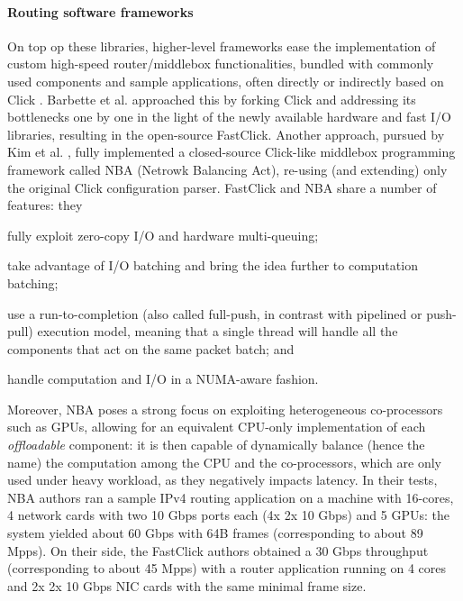 \documentclass[11pt,a4paper,twoside,titlepage,openany]{book}
\begin{document}
\paragraph{Routing software frameworks} On top op these libraries, higher-level frameworks ease the implementation of custom high-speed router/middlebox functionalities, bundled with commonly used components and sample applications, often directly or indirectly based on Click \cite{click}.
Barbette et al. \cite{fastclick} approached this by forking Click and addressing its bottlenecks one by one in the light of the newly available hardware and fast I/O libraries, resulting in the open-source FastClick. Another approach, pursued by Kim et al. \cite{nba}, fully implemented a closed-source Click-like middlebox programming framework called NBA (Netrowk Balancing Act), re-using (and extending) only the original Click configuration parser. %
FastClick and NBA share a number of features: they
\begin{inlineenum}
\item fully exploit zero-copy I/O and hardware multi-queuing;
\item take advantage of I/O batching and bring the idea further to computation batching;
\item use a run-to-completion (also called full-push, in contrast with pipelined or push-pull) execution model, meaning that a single thread will handle all the components that act on the same packet batch; and
\item handle computation and I/O in a \gls{NUMA}-aware fashion.
\end{inlineenum}
Moreover, NBA poses a strong focus on exploiting heterogeneous co-processors such as GPUs, allowing for an equivalent CPU-only implementation of each \emph{offloadable} component: it is then capable of dynamically balance (hence the name) the computation among the CPU and the co-processors, which are only used under heavy workload, as they negatively impacts latency. In their tests, NBA authors ran a sample IPv4 routing application on a machine with 16-cores, 4 network cards with two 10 Gbps ports each (4x 2x 10 Gbps) and 5 GPUs: the system yielded about 60 Gbps with 64B frames (corresponding to about 89 \gls{Mpps}). On their side, the FastClick authors obtained a 30 Gbps throughput (corresponding to about 45 \gls{Mpps}) with a router application running on 4 cores and 2x 2x 10 Gbps NIC cards with the same minimal frame size.
\end{document}
